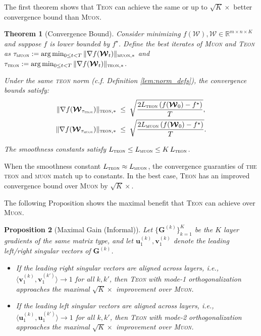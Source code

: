 \documentclass{article}
\newcommand{\ten}[1]{\bm{\mathcal{#1}}}
\newcommand{\mat}[1]{\mathbf{#1}}
\theoremstyle{plain}
\newtheorem{theorem}{Theorem}[section]
\newtheorem{proposition}[theorem]{Proposition}
\theoremstyle{definition}
\theoremstyle{remark}
\begin{document}
The first theorem shows that \textsc{Teon} can achieve the same or up to $\sqrt{K}\times$ better convergence bound than \textsc{Muon}.
\begin{theorem}[Convergence Bound]
Consider minimizing $f(\ten{W}), \ten{W}\in \mathbb{R}^{m\times n\times K}$ and suppose $f$ is lower bounded by $f^\star$. 
Define the best iterates of \textsc{Muon} and \textsc{Teon} as
$\tau_{\textsc{muon}} := \arg\min_{0\le t < T}\|\nabla f(\ten{W}_t)\|_{\textsc{muon},*}$
and
$\tau_{\textsc{teon}} := \arg\min_{0\le t < T}\|\nabla f(\ten{W}_t)\|_{\textsc{teon},*}$.

Under the same \textsc{teon} norm (c.f. Definition \ref{lem:norm_defs}), the convergence bounds satisfy:
\label{thm:convergence_bound_main}
\begin{align}
\|\nabla f(\ten{W}_{\tau_{\textsc{teon}}})\|_{\textsc{teon},*}
&\;\le\;
\sqrt{\frac{2L_{\textsc{teon}}\left(f(\ten{W}_0)-f^\star\right)}{T}}, \nonumber
\\
\|\nabla f(\ten{W}_{\tau_{\textsc{muon}}})\|_{\textsc{teon},*}
&\;\le\;
\sqrt{\frac{2L_{\textsc{muon}}\left(f(\ten{W}_0)-f^\star\right)}{T}} . \nonumber
\end{align}

The smoothness constants satisfy
$
L_{\textsc{teon}} \le L_{\textsc{muon}} \le K \, L_{\textsc{teon}}
$. 
\end{theorem}

When the smoothness constant $L_{\textsc{teon}}\approx L_{\textsc{muon}}$, the convergence guaranties of \textsc{the teon} and \textsc{muon} match up to constants. 
In the best case, \textsc{Teon} has an improved convergence bound over \textsc{Muon} by $\sqrt{K} \times$. 

The following Proposition shows the maximal benefit that \textsc{Teon} can achieve over \textsc{Muon}.

\begin{proposition}[Maximal Gain (Informal)]
\label{prop:maximal_gain}
Let $\{\mat{G}^{(k)}\}_{k=1}^K$ be the $K$ layer gradients of the same matrix type, and let
$\mat{u}_1^{(k)}, \mat{v}_1^{(k)}$ denote the leading left/right singular vectors of $\mat{G}^{(k)}$.
\begin{itemize}
    \item If the leading right singular vectors are aligned across layers, i.e.,
$\langle \mat{v}_1^{(k)}, \mat{v}_1^{(k')}\rangle \to 1$ for all $k,k'$,
then \textsc{Teon} with mode-1 orthogonalization approaches the maximal $\sqrt{K}\times$ improvement over \textsc{Muon}.

\item If the leading left singular vectors are aligned across layers, i.e.,
$\langle \mat{u}_1^{(k)}, \mat{u}_1^{(k')}\rangle \to 1$ for all $k,k'$,
then \textsc{Teon} with mode-2 orthogonalization approaches the maximal $\sqrt{K} \times$ improvement over \textsc{Muon}.
\end{itemize}
\end{proposition}
\end{document}
